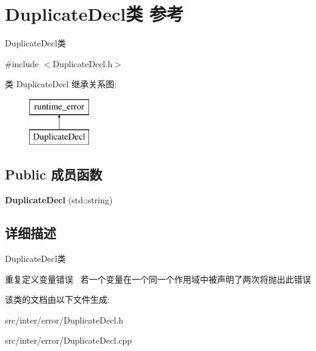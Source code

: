 \hypertarget{class_duplicate_decl}{}\section{Duplicate\+Decl类 参考}
\label{class_duplicate_decl}


Duplicate\+Decl类  




{\ttfamily \#include $<$Duplicate\+Decl.\+h$>$}

类 Duplicate\+Decl 继承关系图\+:\begin{figure}[H]
\begin{center}
\leavevmode
\includegraphics[height=2.000000cm]{class_duplicate_decl}
\end{center}
\end{figure}
\subsection*{Public 成员函数}
\begin{DoxyCompactItemize}
\item 
\mbox{\label{class_duplicate_decl_a101a07d46a713363621da69f46a711b3}} 
{\bfseries Duplicate\+Decl} (std\+::string)
\end{DoxyCompactItemize}


\subsection{详细描述}
Duplicate\+Decl类 

重复定义变量错误~\newline
若一个变量在一个同一个作用域中被声明了两次将抛出此错误 

该类的文档由以下文件生成\+:\begin{DoxyCompactItemize}
\item 
src/inter/error/Duplicate\+Decl.\+h\item 
src/inter/error/Duplicate\+Decl.\+cpp\end{DoxyCompactItemize}
